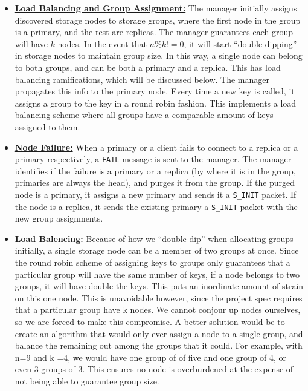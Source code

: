 \documentclass{article}
\begin{document}
\begin{itemize}
    \item \textbf{\underline{Load Balancing and Group Assignment:}} The manager initially assigns discovered storage nodes to storage groups, where the first node in the group
    is a primary, and the rest are replicas. The manager guarantees each group will have $k$ nodes. In the event that $n \% k != 0$, it will start ``double dipping'' in storage nodes
    to maintain group size. In this way, a single node can belong to both groups, and can be both a primary and a replica. This has load balancing ramifications, which will be discussed below. 
    The manager propagates this info to the primary node. Every time a new key is called, it assigns a group to the key in a round robin fashion. 
    This implements a load balancing scheme where all groups have a comparable amount of keys assigned to them.
    \item \textbf{\underline{Node Failure:}} When a primary or a client fails to connect to a replica or a primary respectively, a \texttt{FAIL} message is sent to the manager. 
    The manager identifies if the failure is a primary or a replica (by where it is in the group, primaries are always the head), and purges it from the group. If the purged
    node is a primary, it assigns a new primary and sends it a \texttt{S\_INIT} packet. If the node is a replica, it sends the existing primary a \texttt{S\_INIT} packet with the 
    new group assignments. 
    \item \textbf{\underline{Load Balencing:}} Because of how we ``double dip'' when allocating groups initially, a single storage node can be a member of two groups at once. Since the 
    round robin scheme of assigning keys to groups only guarantees that a particular group will have the same number of keys, if a node belongs to two groups, it will have double the keys.
    This puts an inordinate amount of strain on this one node. This is unavoidable however, since the project spec requires that a particular group have k nodes. We cannot conjour up nodes
    ourselves, so we are forced to make this compromise. A better solution would be to create an algorithm that would only ever assign a node to a single group, and balance the remaining
    out among the groups that it could. For example, with n=9 and k =4, we would have one group of of five and one group of 4, or even 3 groups of 3. This ensures no node is overburdened
    at the expense of not being able to guarantee group size.
\end{itemize}
\end{document}
